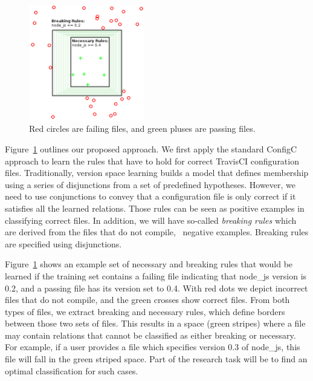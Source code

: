 \begin{figure}
  \includegraphics[width=0.45\textwidth]{figs/Version_space}
  \caption{\small Red circles are failing files, and green pluses are passing files.}
  \label{fig:versionSL}
\end{figure}

Figure~\ref{fig:versionSL} outlines our proposed approach. We first apply the standard ConfigC approach to learn the rules that have 
to hold for correct TravisCI configuration files. Traditionally, 
version space learning builds a model that defines membership using a series of 
disjunctions from a set of predefined hypotheses.  However, we need  to 
use conjunctions to convey that a configuration file is only correct if 
it satisfies all the learned relations. Those rules can be seen as
positive examples in classifying correct files. In addition, we will have
so-called {\emph {breaking rules}} which are derived from the files 
that do not compile, \ie~negative examples. Breaking rules are specified 
using disjunctions.

Figure~\ref{fig:versionSL} shows an example set of necessary and breaking rules that would be learned if the training set contains a failing file indicating that 
{\small node\_js} version is 0.2, and a passing file has its version set to 0.4.
With red dots we depict incorrect files that do not compile, and the green crosses show correct files.
From both types of files, we extract breaking and necessary rules, which define borders between those two sets of files.
This results in a space (green stripes) where a file may contain relations that cannot be classified as either breaking or necessary.
For example, if a user provides a file which specifies version 0.3 of {\small node\_js}, this file will fall in the green striped space.
Part of the research task will be to find an optimal classification for such cases.

